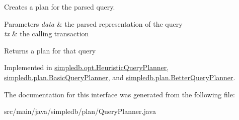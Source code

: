 Creates a plan for the parsed query. 
\begin{DoxyParams}{Parameters}
{\em data} & the parsed representation of the query \\
\hline
{\em tx} & the calling transaction \\
\hline
\end{DoxyParams}
\begin{DoxyReturn}{Returns}
a plan for that query 
\end{DoxyReturn}


Implemented in \hyperlink{classsimpledb_1_1opt_1_1HeuristicQueryPlanner_ae822113f750c0944a227a6de344d35f7}{simpledb.\+opt.\+Heuristic\+Query\+Planner}, \hyperlink{classsimpledb_1_1plan_1_1BasicQueryPlanner_af3daad5c5e44335beb608d1f4f5bf16f}{simpledb.\+plan.\+Basic\+Query\+Planner}, and \hyperlink{classsimpledb_1_1plan_1_1BetterQueryPlanner_a887ebdcc02b0de4a2bc8545cce7efa20}{simpledb.\+plan.\+Better\+Query\+Planner}.



The documentation for this interface was generated from the following file\+:\begin{DoxyCompactItemize}
\item 
src/main/java/simpledb/plan/Query\+Planner.\+java\end{DoxyCompactItemize}
